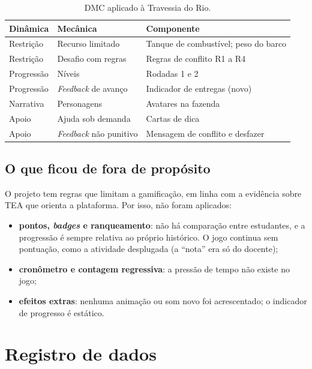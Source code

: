 \documentclass[12pt]{article}
\begin{document}
\begin{table}[ht]
\centering
\small
\caption{DMC aplicado à Travessia do Rio.}
\label{tab:dmc}
\begin{tabular}{@{}>{\raggedright\arraybackslash}p{2.4cm}>{\raggedright\arraybackslash}p{2.8cm}>{\raggedright\arraybackslash}p{4.0cm}@{}}
\toprule
\textbf{Dinâmica} & \textbf{Mecânica} & \textbf{Componente} \\
\midrule
Restrição & Recurso limitado & Tanque de combustível; peso do barco \\
Restrição & Desafio com regras & Regras de conflito R1 a R4 \\
Progressão & Níveis & Rodadas 1 e 2 \\
Progressão & \textit{Feedback} de avanço & Indicador de entregas (novo) \\
Narrativa & Personagens & Avatares na fazenda \\
Apoio & Ajuda sob demanda & Cartas de dica \\
Apoio & \textit{Feedback} não punitivo & Mensagem de conflito e desfazer \\
\bottomrule
\end{tabular}
\end{table}

\subsection{O que ficou de fora de propósito}

O projeto tem regras que limitam a gamificação, em linha com a evidência sobre
TEA que orienta a plataforma. Por isso, não foram aplicados:

\begin{itemize}
  \item \textbf{pontos, \textit{badges} e ranqueamento}: não há comparação entre
        estudantes, e a progressão é sempre relativa ao próprio histórico. O
        jogo continua sem pontuação, como a atividade desplugada (a ``nota'' era
        só do docente);
  \item \textbf{cronômetro e contagem regressiva}: a pressão de tempo não existe
        no jogo;
  \item \textbf{efeitos extras}: nenhuma animação ou som novo foi acrescentado;
        o indicador de progresso é estático.
\end{itemize}

\section{Registro de dados}
\end{document}
